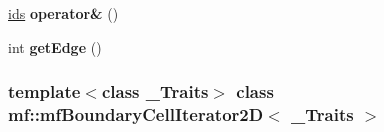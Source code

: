 \begin{DoxyCompactItemize}
\item 
\hypertarget{classmf_1_1mfBoundaryCellIterator2D_aae991485205ab0672814fcb24334abe7}{
\hyperlink{classmf_1_1mfBoundaryCellIterator2D_ac315487c67a3604069747dc93ccb2fa0}{ids} {\bfseries operator\&} ()}
\label{classmf_1_1mfBoundaryCellIterator2D_aae991485205ab0672814fcb24334abe7}

\item 
\hypertarget{classmf_1_1mfBoundaryCellIterator2D_a53aeb98ac0e8405f2d6961092bb67f50}{
int {\bfseries getEdge} ()}
\label{classmf_1_1mfBoundaryCellIterator2D_a53aeb98ac0e8405f2d6961092bb67f50}

\end{DoxyCompactItemize}
\subsubsection*{template$<$class \_\-Traits$>$ class mf::mfBoundaryCellIterator2D$<$ \_\-Traits $>$}




